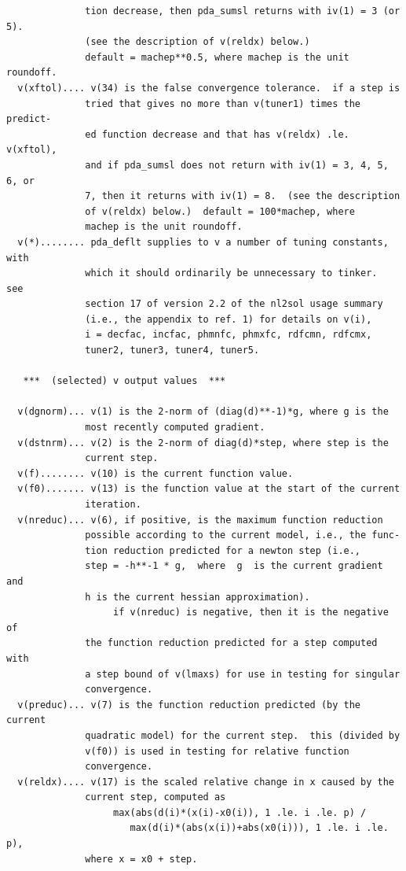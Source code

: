 \documentclass[11pt,twoside]{article}
\begin{document}
\begin{verbatim}
              tion decrease, then pda_sumsl returns with iv(1) = 3 (or 5).
              (see the description of v(reldx) below.)
              default = machep**0.5, where machep is the unit roundoff.
  v(xftol).... v(34) is the false convergence tolerance.  if a step is
              tried that gives no more than v(tuner1) times the predict-
              ed function decrease and that has v(reldx) .le. v(xftol),
              and if pda_sumsl does not return with iv(1) = 3, 4, 5, 6, or
              7, then it returns with iv(1) = 8.  (see the description
              of v(reldx) below.)  default = 100*machep, where
              machep is the unit roundoff.
  v(*)........ pda_deflt supplies to v a number of tuning constants, with
              which it should ordinarily be unnecessary to tinker.  see
              section 17 of version 2.2 of the nl2sol usage summary
              (i.e., the appendix to ref. 1) for details on v(i),
              i = decfac, incfac, phmnfc, phmxfc, rdfcmn, rdfcmx,
              tuner2, tuner3, tuner4, tuner5.

   ***  (selected) v output values  ***

  v(dgnorm)... v(1) is the 2-norm of (diag(d)**-1)*g, where g is the
              most recently computed gradient.
  v(dstnrm)... v(2) is the 2-norm of diag(d)*step, where step is the
              current step.
  v(f)........ v(10) is the current function value.
  v(f0)....... v(13) is the function value at the start of the current
              iteration.
  v(nreduc)... v(6), if positive, is the maximum function reduction
              possible according to the current model, i.e., the func-
              tion reduction predicted for a newton step (i.e.,
              step = -h**-1 * g,  where  g  is the current gradient and
              h is the current hessian approximation).
                   if v(nreduc) is negative, then it is the negative of
              the function reduction predicted for a step computed with
              a step bound of v(lmaxs) for use in testing for singular
              convergence.
  v(preduc)... v(7) is the function reduction predicted (by the current
              quadratic model) for the current step.  this (divided by
              v(f0)) is used in testing for relative function
              convergence.
  v(reldx).... v(17) is the scaled relative change in x caused by the
              current step, computed as
                   max(abs(d(i)*(x(i)-x0(i)), 1 .le. i .le. p) /
                      max(d(i)*(abs(x(i))+abs(x0(i))), 1 .le. i .le. p),
              where x = x0 + step.


\end{verbatim}
\end{document}
